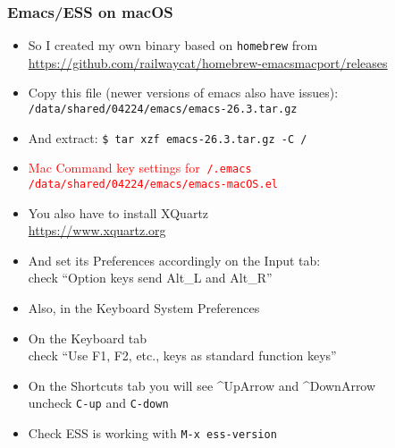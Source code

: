 \documentclass[11pt,pdftex,dvipsnames,usenames,helvetica]{beamer}
\begin{document}
\begin{frame}
\frametitle{Emacs/ESS on macOS}

\begin{itemize}
\item So I created my own binary based on {\tt homebrew} from
\url{https://github.com/railwaycat/homebrew-emacsmacport/releases}
\item Copy this file (newer versions of emacs also have issues): 
{\tt /data/shared/04224/emacs/emacs-26.3.tar.gz}
\item And extract: {\tt \$ tar xzf emacs-26.3.tar.gz -C /}
\item \textcolor{red}{Mac Command key settings for {\tt $~$/.emacs}\\ 
{\tt /data/shared/04224/emacs/emacs-macOS.el}}
\item You also have to install XQuartz\\
\url{https://www.xquartz.org}
\item And set its Preferences accordingly on the Input tab:\\
check ``Option keys send Alt\_L and Alt\_R''
\item Also, in the Keyboard System Preferences
\item On the Keyboard tab\\
check ``Use F1, F2, etc., keys as standard function keys''
\item On the Shortcuts tab you will see \textasciicircum UpArrow
and \textasciicircum DownArrow\\
uncheck {\tt C-up} and {\tt C-down} 
\item Check ESS is working with {\tt M-x ess-version}
\end{itemize}
\end{frame}
\end{document}
